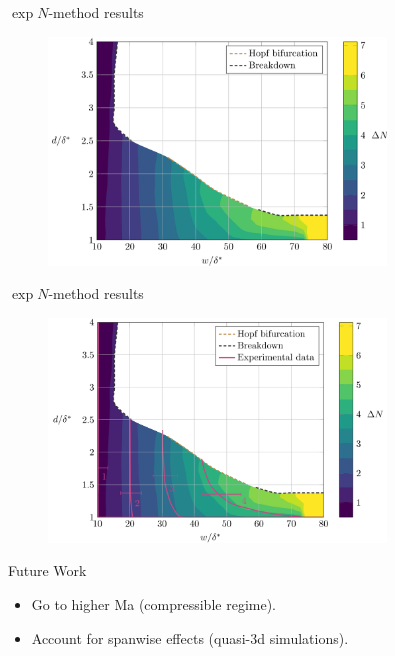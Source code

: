 \documentclass[aspectratio=43, xcolor=table]{beamer}
\begin{document}
\begin{frame}{$\exp{N}$-method results}
	\begin{figure}
		\centering
		\includegraphics[width=0.8\textwidth]{Images/nfactor_countour_plain.png}
	\end{figure}
	\vspace{0.42cm}
\end{frame}
\begin{frame}{$\exp{N}$-method results}
	\begin{figure}
		\centering
		\includegraphics[width=0.8\textwidth]{Images/nfactor_countour.png}
	\end{figure}
\end{frame}
\begin{frame}{Future Work}
	\begin{itemize}
		\item Go to higher Ma (compressible regime).\pause
		\item Account for spanwise effects (quasi-3d simulations).
	\end{itemize}
\end{frame}
\end{document}
